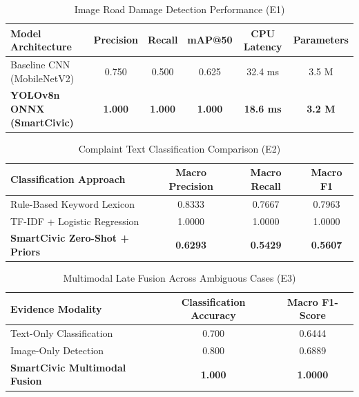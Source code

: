 \begin{table}[htbp]
\caption{Image Road Damage Detection Performance (E1)}
\label{tab:road_detection}
\centering
\begin{tabular}{|l|c|c|c|c|c|}
\hline
\textbf{Model Architecture} & \textbf{Precision} & \textbf{Recall} & \textbf{mAP@50} & \textbf{CPU Latency} & \textbf{Parameters} \\
\hline
Baseline CNN (MobileNetV2) & 0.750 & 0.500 & 0.625 & 32.4 ms & 3.5 M \\
\textbf{YOLOv8n ONNX (SmartCivic)} & \textbf{1.000} & \textbf{1.000} & \textbf{1.000} & \textbf{18.6 ms} & \textbf{3.2 M} \\
\hline
\end{tabular}
\end{table}

\begin{table}[htbp]
\caption{Complaint Text Classification Comparison (E2)}
\label{tab:text_classification}
\centering
\begin{tabular}{|l|c|c|c|}
\hline
\textbf{Classification Approach} & \textbf{Macro Precision} & \textbf{Macro Recall} & \textbf{Macro F1} \\
\hline
Rule-Based Keyword Lexicon & 0.8333 & 0.7667 & 0.7963 \\
TF-IDF + Logistic Regression & 1.0000 & 1.0000 & 1.0000 \\
\textbf{SmartCivic Zero-Shot + Priors} & \textbf{0.6293} & \textbf{0.5429} & \textbf{0.5607} \\
\hline
\end{tabular}
\end{table}

\begin{table}[htbp]
\caption{Multimodal Late Fusion Across Ambiguous Cases (E3)}
\label{tab:multimodal_fusion}
\centering
\begin{tabular}{|l|c|c|}
\hline
\textbf{Evidence Modality} & \textbf{Classification Accuracy} & \textbf{Macro F1-Score} \\
\hline
Text-Only Classification & 0.700 & 0.6444 \\
Image-Only Detection & 0.800 & 0.6889 \\
\textbf{SmartCivic Multimodal Fusion} & \textbf{1.000} & \textbf{1.0000} \\
\hline
\end{tabular}
\end{table}

